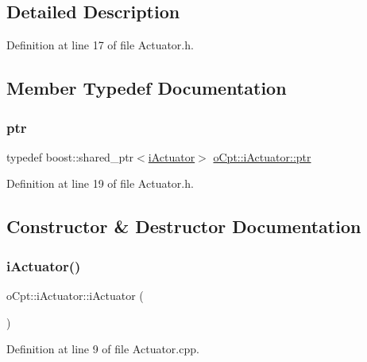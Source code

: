 \subsection{Detailed Description}


Definition at line 17 of file Actuator.\+h.



\subsection{Member Typedef Documentation}
\hypertarget{classo_cpt_1_1i_actuator_a35847799558e92bb84fb6c71de772cac}{}\label{classo_cpt_1_1i_actuator_a35847799558e92bb84fb6c71de772cac} 
\subsubsection{\texorpdfstring{ptr}{ptr}}
{\footnotesize\ttfamily typedef boost\+::shared\+\_\+ptr$<$\hyperlink{classo_cpt_1_1i_actuator}{i\+Actuator}$>$ \hyperlink{classo_cpt_1_1i_actuator_a35847799558e92bb84fb6c71de772cac}{o\+Cpt\+::i\+Actuator\+::ptr}}



Definition at line 19 of file Actuator.\+h.



\subsection{Constructor \& Destructor Documentation}
\hypertarget{classo_cpt_1_1i_actuator_aa54aeed96c53b59fd4caa93bc29ce615}{}\label{classo_cpt_1_1i_actuator_aa54aeed96c53b59fd4caa93bc29ce615} 
\subsubsection{\texorpdfstring{i\+Actuator()}{iActuator()}}
{\footnotesize\ttfamily o\+Cpt\+::i\+Actuator\+::i\+Actuator (\begin{DoxyParamCaption}{ }\end{DoxyParamCaption})}



Definition at line 9 of file Actuator.\+cpp.

\hypertarget{classo_cpt_1_1i_actuator_a9ec8a13b323499731fcb43c728c4812e}{}\label{classo_cpt_1_1i_actuator_a9ec8a13b323499731fcb43c728c4812e} 
